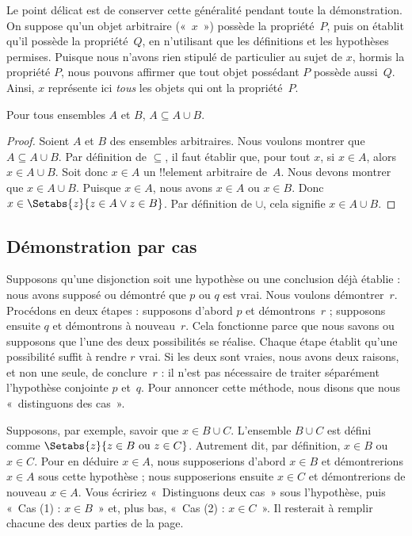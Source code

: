 \documentclass[../../../include/open-logic-section]{subfiles}
\begin{document}
Le point délicat est de conserver cette généralité pendant
toute la démonstration. On suppose qu'un objet arbitraire
(«~$x$~») possède la propriété~$P$, puis on établit qu'il
possède la propriété~$Q$, en n'utilisant que les définitions
et les hypothèses permises. Puisque nous n'avons rien
stipulé de particulier au sujet de $x$, hormis la propriété
$P$, nous pouvons affirmer que tout objet possédant $P$
possède aussi~$Q$. Ainsi, $x$ représente ici \emph{tous}
les objets qui ont la propriété~$P$.

\begin{prop}
  Pour tous ensembles $A$ et $B$, $A \subseteq A \cup B$.
\end{prop}

\begin{proof}
  Soient $A$ et $B$ des ensembles arbitraires. Nous voulons
  montrer que $A \subseteq A \cup B$. Par définition de
  $\subseteq$, il faut établir que, pour tout $x$, si
  $x \in A$, alors $x \in A \cup B$. Soit donc $x \in A$
  un !!{element} arbitraire de~$A$. Nous devons montrer
  que $x \in A \cup B$. Puisque $x \in A$, nous avons
  $x \in A$ ou $x \in B$. Donc
  $x \in \Setabs{z}{z \in A \lor z \in B}$.
  Par définition de $\cup$, cela signifie
  $x \in A \cup B$.
\end{proof}

\subsection{Démonstration par cas}

Supposons qu'une disjonction soit une hypothèse ou une
conclusion déjà établie : nous avons supposé ou démontré
que $p$ ou $q$ est vrai. Nous voulons démontrer~$r$.
Procédons en deux étapes : supposons d'abord $p$ et
démontrons~$r$ ; supposons ensuite $q$ et démontrons
à nouveau~$r$. Cela fonctionne parce que nous savons
ou supposons que l'une des deux possibilités se réalise.
Chaque étape établit qu'une possibilité suffit à rendre
$r$ vrai. Si les deux sont vraies, nous avons deux raisons,
et non une seule, de conclure~$r$ : il n'est pas nécessaire
de traiter séparément l'hypothèse conjointe $p$ et~$q$.
Pour annoncer cette méthode, nous disons que nous
«~distinguons des cas~».

Supposons, par exemple, savoir que $x \in B \cup C$.
L'ensemble $B \cup C$ est défini comme
$\Setabs{z}{z \in B \text{ ou } z \in C}$.
Autrement dit, par définition, $x \in B$ ou $x \in C$.
Pour en déduire $x \in A$, nous supposerions d'abord
$x \in B$ et démontrerions $x \in A$ sous cette
hypothèse ; nous supposerions ensuite $x \in C$ et
démontrerions de nouveau $x \in A$. Vous écririez
«~Distinguons deux cas~» sous l'hypothèse, puis
«~Cas (1) : $x \in B$~» et, plus bas,
«~Cas (2) : $x \in C$~». Il resterait à remplir
chacune des deux parties de la page.
\end{document}
